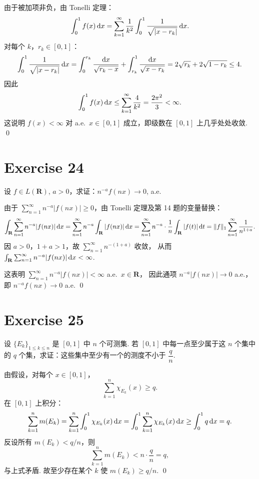 \documentclass{article}
\begin{document}
\begin{solution}
  由于被加项非负，由 Tonelli 定理：
  \[
    \int_0^1 f(x)\,\mathrm{d} x
    = \sum_{k=1}^{\infty} \frac{1}{k^2} \int_0^1 \frac{1}{\sqrt{|x - r_k|}}\,\mathrm{d} x.
  \]
  对每个 $k$，$r_k \in [0,1]$：
  \[
    \int_0^1 \frac{1}{\sqrt{|x - r_k|}}\,\mathrm{d} x
    = \int_0^{r_k} \frac{\mathrm{d} x}{\sqrt{r_k - x}}
    + \int_{r_k}^1 \frac{\mathrm{d} x}{\sqrt{x - r_k}}
    = 2\sqrt{r_k} + 2\sqrt{1 - r_k} \le 4.
  \]
  因此
  \[
    \int_0^1 f(x)\,\mathrm{d} x \le \sum_{k=1}^{\infty} \frac{4}{k^2} = \frac{2\pi^2}{3} < \infty.
  \]
  这说明 $f(x) < \infty$ 对 a.e.\ $x \in [0,1]$ 成立，即级数在 $[0,1]$ 上几乎处处收敛. \qed
\end{solution}

\section{Exercise 24}

设 $f \in L(\mathbf{R})$, $a > 0$，求证：$n^{-a}f(nx) \to 0$, a.e.

\begin{solution}
  由于 $\sum_{n=1}^{\infty} n^{-a}|f(nx)| \ge 0$，由 Tonelli 定理及第 14 题的变量替换：
  \[
    \int_{\mathbf{R}} \sum_{n=1}^{\infty} n^{-a}|f(nx)|\,\mathrm{d} x
    = \sum_{n=1}^{\infty} n^{-a} \int_{\mathbf{R}} |f(nx)|\,\mathrm{d} x
    = \sum_{n=1}^{\infty} n^{-a} \cdot \frac{1}{n} \int_{\mathbf{R}} |f(t)|\,\mathrm{d} t
    = \|f\|_1 \sum_{n=1}^{\infty} \frac{1}{n^{1+a}}.
  \]
  因 $a > 0$，$1 + a > 1$，故 $\sum_{n=1}^{\infty} n^{-(1+a)}$ 收敛，
  从而 $\int_{\mathbf{R}} \sum_{n=1}^{\infty} n^{-a}|f(nx)|\,\mathrm{d} x < \infty$.

  这表明 $\sum_{n=1}^{\infty} n^{-a}|f(nx)| < \infty$ a.e.\ $x \in \mathbf{R}$，
  因此通项 $n^{-a}|f(nx)| \to 0$ a.e.，即 $n^{-a}f(nx) \to 0$ a.e. \qed
\end{solution}

\section{Exercise 25}

设 $\{E_k\}_{1 \le k \le n}$ 是 $[0, 1]$ 中 $n$ 个可测集. 若 $[0, 1]$ 中每一点至少属于这 $n$ 个集中的 $q$ 个集，求证：这些集中至少有一个的测度不小于 $\dfrac{q}{n}$.

\begin{solution}
  由假设，对每个 $x \in [0,1]$，
  \[
    \sum_{k=1}^n \chi_{E_k}(x) \ge q.
  \]
  在 $[0,1]$ 上积分：
  \[
    \sum_{k=1}^n m(E_k)
    = \sum_{k=1}^n \int_0^1 \chi_{E_k}(x)\,\mathrm{d} x
    = \int_0^1 \sum_{k=1}^n \chi_{E_k}(x)\,\mathrm{d} x
    \ge \int_0^1 q\,\mathrm{d} x = q.
  \]
  反设所有 $m(E_k) < q/n$，则
  \[
    \sum_{k=1}^n m(E_k) < n \cdot \frac{q}{n} = q,
  \]
  与上式矛盾. 故至少存在某个 $k$ 使 $m(E_k) \ge q/n$. \qed
\end{solution}
\end{document}
